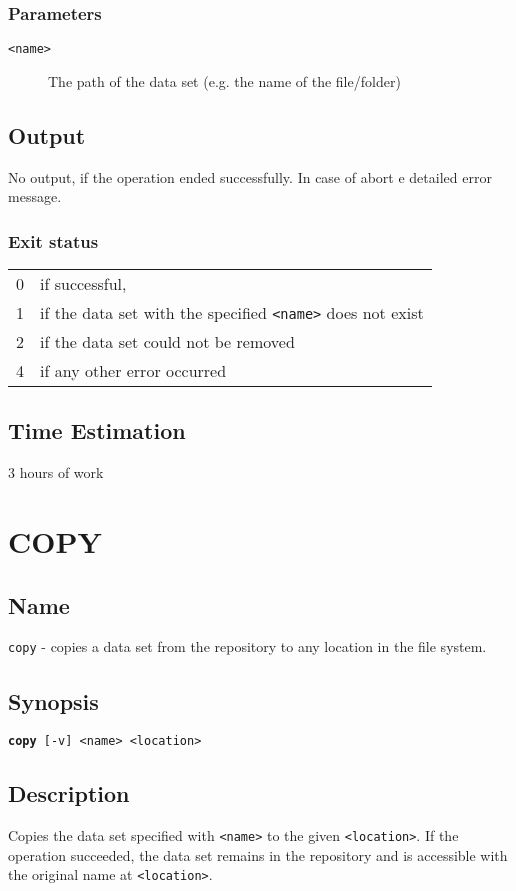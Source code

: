 \documentclass{article} %
\begin{document}
		\subsubsection*{Parameters}
		\begin{description}
			\item[\texttt{<name>}] The path of the data set (e.g. the name of the file/folder)
		\end{description}
		\subsection*{Output}
		No output, if the operation ended successfully. In case of abort e detailed error message.
		\subsubsection*{Exit status}
		\begin{tabular}{ll}
			0 &  if successful,\\ 
			1 &  if the data set with the specified \texttt{<name>} does not exist\\ 
			2 &  if the data set could not be removed\\
			4 &  if any other error occurred\\
		\end{tabular}
				\subsection*{Time Estimation}
				3 hours of work \\
				\noindent
		\newpage
		\section*{COPY}
		\subsection*{Name}
		\texttt{copy} - copies a data set from the repository to any location in the file system.
		\subsection*{Synopsis}
		\texttt{\textbf{copy} [-v] <name> <location>}
		\subsection*{Description}
		Copies the data set specified with \texttt{<name>} to the given \texttt{<location>}.
		If the operation succeeded, the data set remains in the repository and is accessible with the original name at  \texttt{<location>}.\\
		
\end{document}
